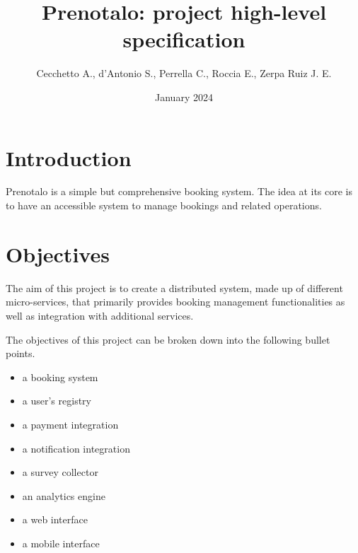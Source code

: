 \documentclass{article}
\title{Prenotalo: project high-level specification}
\author{Cecchetto A., d'Antonio S., Perrella C., Roccia E., Zerpa Ruiz J. E.}
\date{January 2024}
\begin{document}
\maketitle

\section{Introduction}
Prenotalo is a simple but comprehensive booking system. The idea at its core is
to have an accessible system to manage bookings and related operations.

\section{Objectives}
The aim of this project is to create a distributed system, made up of different
micro-services, that primarily provides booking management functionalities
as well as integration with additional services. 

The objectives of this project can be broken down into the following bullet points.
\begin{itemize}
\item a booking system
\item a user's registry
\item a payment integration
\item a notification integration
\item a survey collector
\item an analytics engine
\item a web interface
\item a mobile interface
\end{itemize}
\end{document}
